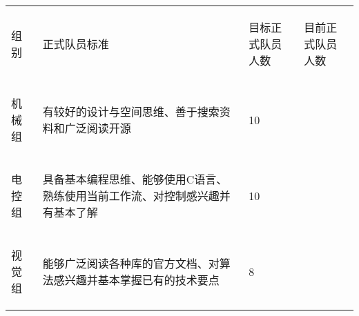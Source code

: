 \begin{longtable}{X | X | X | X}
    \hline

    \endfoot

    \rowcolor{tabhdcolor}

        \multicolumn{4}{c}{队员架构}\\

    \hline

    \endhead

        \begin{center}
            组别
        \end{center} &
        \begin{center}
            正式队员标准
        \end{center} &
        \begin{center}
            目标正式队员人数
        \end{center} &
        \begin{center}
            目前正式队员人数
        \end{center}\\

    \hline

        \begin{center}
            机械组
        \end{center} &
        有较好的设计与空间思维、善于搜索资料和广泛阅读开源 &
        \begin{center}
            10
        \end{center}&
        \\

    \hline

        \begin{center}
            电控组
        \end{center} &
        具备基本编程思维、能够使用C语言、熟练使用当前工作流、对控制感兴趣并有基本了解 &
        \begin{center}
            10
        \end{center}&
        \\

    \hline

        \begin{center}
            视觉组
        \end{center} &
        能够广泛阅读各种库的官方文档、对算法感兴趣并基本掌握已有的技术要点 &
        \begin{center}
            8
        \end{center}&
        \\


\end{longtable}

